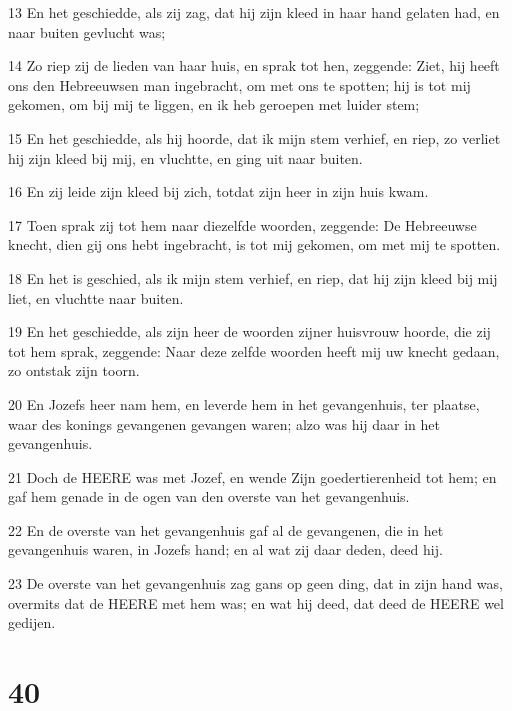 \par 13 En het geschiedde, als zij zag, dat hij zijn kleed in haar hand gelaten had, en naar buiten gevlucht was;
\par 14 Zo riep zij de lieden van haar huis, en sprak tot hen, zeggende: Ziet, hij heeft ons den Hebreeuwsen man ingebracht, om met ons te spotten; hij is tot mij gekomen, om bij mij te liggen, en ik heb geroepen met luider stem;
\par 15 En het geschiedde, als hij hoorde, dat ik mijn stem verhief, en riep, zo verliet hij zijn kleed bij mij, en vluchtte, en ging uit naar buiten.
\par 16 En zij leide zijn kleed bij zich, totdat zijn heer in zijn huis kwam.
\par 17 Toen sprak zij tot hem naar diezelfde woorden, zeggende: De Hebreeuwse knecht, dien gij ons hebt ingebracht, is tot mij gekomen, om met mij te spotten.
\par 18 En het is geschied, als ik mijn stem verhief, en riep, dat hij zijn kleed bij mij liet, en vluchtte naar buiten.
\par 19 En het geschiedde, als zijn heer de woorden zijner huisvrouw hoorde, die zij tot hem sprak, zeggende: Naar deze zelfde woorden heeft mij uw knecht gedaan, zo ontstak zijn toorn.
\par 20 En Jozefs heer nam hem, en leverde hem in het gevangenhuis, ter plaatse, waar des konings gevangenen gevangen waren; alzo was hij daar in het gevangenhuis.
\par 21 Doch de HEERE was met Jozef, en wende Zijn goedertierenheid tot hem; en gaf hem genade in de ogen van den overste van het gevangenhuis.
\par 22 En de overste van het gevangenhuis gaf al de gevangenen, die in het gevangenhuis waren, in Jozefs hand; en al wat zij daar deden, deed hij.
\par 23 De overste van het gevangenhuis zag gans op geen ding, dat in zijn hand was, overmits dat de HEERE met hem was; en wat hij deed, dat deed de HEERE wel gedijen.

\chapter{40}

